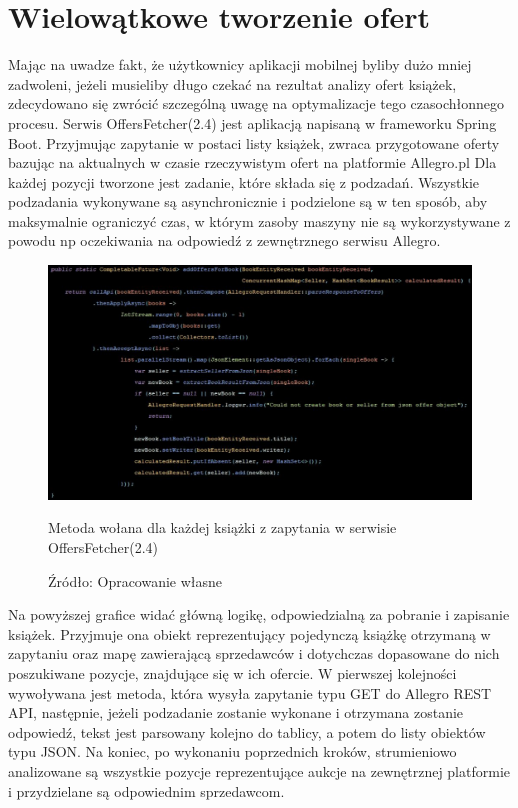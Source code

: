 \section{Wielowątkowe tworzenie ofert}
Mając na uwadze fakt, że użytkownicy aplikacji mobilnej byliby dużo mniej zadwoleni, jeżeli musieliby długo czekać na rezultat analizy ofert książek, zdecydowano się zwrócić szczególną uwagę na optymalizacje tego czasochłonnego procesu.
Serwis OffersFetcher(2.4) jest aplikacją napisaną w frameworku Spring Boot. Przyjmując zapytanie w postaci listy książek, zwraca przygotowane oferty bazując na aktualnych w czasie rzeczywistym ofert na platformie Allegro.pl
Dla każdej pozycji tworzone jest zadanie, które składa się z podzadań. Wszystkie podzadania wykonywane są asynchronicznie i podzielone są w ten sposób, aby maksymalnie ograniczyć czas, w którym zasoby maszyny nie są wykorzystywane z powodu np oczekiwania na odpowiedź z zewnętrznego serwisu Allegro.
\begin{figure}[H]
	\centering
	\includegraphics[width=\linewidth]{tasks.pdf}
	\caption{Metoda wołana dla każdej książki z zapytania w serwisie OffersFetcher(2.4)}
	\caption*{Źródło: {Opracowanie własne}}
\end{figure}
Na powyższej grafice widać główną logikę, odpowiedzialną za pobranie i zapisanie książek. Przyjmuje ona obiekt reprezentujący pojedynczą książkę otrzymaną w zapytaniu oraz mapę zawierającą sprzedawców i dotychczas dopasowane do nich poszukiwane pozycje, znajdujące się w ich ofercie.
W pierwszej kolejności wywoływana jest metoda, która wysyła zapytanie typu GET do Allegro REST API, następnie, jeżeli podzadanie zostanie wykonane i  otrzymana zostanie odpowiedź, tekst jest parsowany kolejno do tablicy, a potem do listy obiektów typu JSON.
Na koniec, po wykonaniu poprzednich kroków, strumieniowo analizowane są wszystkie pozycje reprezentujące aukcje na zewnętrznej platformie i przydzielane są odpowiednim sprzedawcom.


